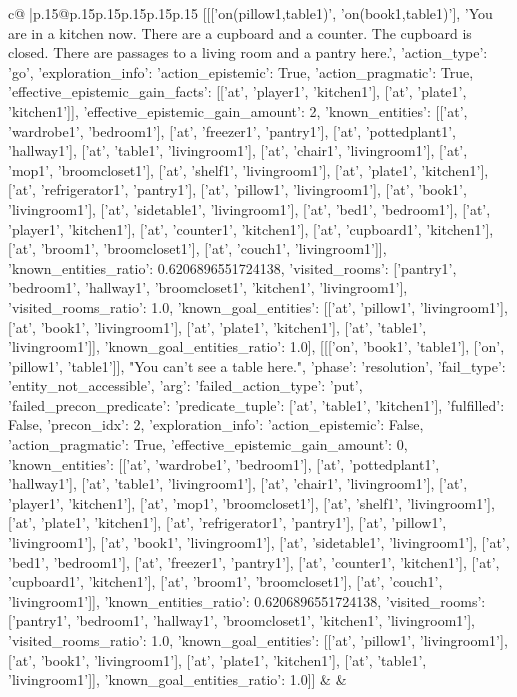 \documentclass{article}
\begin{document}
{\begin{supertabular}{c@{$\;$}|p{.15\linewidth}@{}p{.15\linewidth}p{.15\linewidth}p{.15\linewidth}p{.15\linewidth}p{.15\linewidth}}
{{{	 [[['on(pillow1,table1)', 'on(book1,table1)'], 'You are in a kitchen now. There are a cupboard and a counter. The cupboard is closed. There are passages to a living room and a pantry here.', {'action_type': 'go', 'exploration_info': {'action_epistemic': True, 'action_pragmatic': True, 'effective_epistemic_gain_facts': [['at', 'player1', 'kitchen1'], ['at', 'plate1', 'kitchen1']], 'effective_epistemic_gain_amount': 2, 'known_entities': [['at', 'wardrobe1', 'bedroom1'], ['at', 'freezer1', 'pantry1'], ['at', 'pottedplant1', 'hallway1'], ['at', 'table1', 'livingroom1'], ['at', 'chair1', 'livingroom1'], ['at', 'mop1', 'broomcloset1'], ['at', 'shelf1', 'livingroom1'], ['at', 'plate1', 'kitchen1'], ['at', 'refrigerator1', 'pantry1'], ['at', 'pillow1', 'livingroom1'], ['at', 'book1', 'livingroom1'], ['at', 'sidetable1', 'livingroom1'], ['at', 'bed1', 'bedroom1'], ['at', 'player1', 'kitchen1'], ['at', 'counter1', 'kitchen1'], ['at', 'cupboard1', 'kitchen1'], ['at', 'broom1', 'broomcloset1'], ['at', 'couch1', 'livingroom1']], 'known_entities_ratio': 0.6206896551724138, 'visited_rooms': ['pantry1', 'bedroom1', 'hallway1', 'broomcloset1', 'kitchen1', 'livingroom1'], 'visited_rooms_ratio': 1.0, 'known_goal_entities': [['at', 'pillow1', 'livingroom1'], ['at', 'book1', 'livingroom1'], ['at', 'plate1', 'kitchen1'], ['at', 'table1', 'livingroom1']], 'known_goal_entities_ratio': 1.0}}], [[['on', 'book1', 'table1'], ['on', 'pillow1', 'table1']], "You can't see a table here.", {'phase': 'resolution', 'fail_type': 'entity_not_accessible', 'arg': {'failed_action_type': 'put', 'failed_precon_predicate': {'predicate_tuple': ['at', 'table1', 'kitchen1'], 'fulfilled': False, 'precon_idx': 2}}, 'exploration_info': {'action_epistemic': False, 'action_pragmatic': True, 'effective_epistemic_gain_amount': 0, 'known_entities': [['at', 'wardrobe1', 'bedroom1'], ['at', 'pottedplant1', 'hallway1'], ['at', 'table1', 'livingroom1'], ['at', 'chair1', 'livingroom1'], ['at', 'player1', 'kitchen1'], ['at', 'mop1', 'broomcloset1'], ['at', 'shelf1', 'livingroom1'], ['at', 'plate1', 'kitchen1'], ['at', 'refrigerator1', 'pantry1'], ['at', 'pillow1', 'livingroom1'], ['at', 'book1', 'livingroom1'], ['at', 'sidetable1', 'livingroom1'], ['at', 'bed1', 'bedroom1'], ['at', 'freezer1', 'pantry1'], ['at', 'counter1', 'kitchen1'], ['at', 'cupboard1', 'kitchen1'], ['at', 'broom1', 'broomcloset1'], ['at', 'couch1', 'livingroom1']], 'known_entities_ratio': 0.6206896551724138, 'visited_rooms': ['pantry1', 'bedroom1', 'hallway1', 'broomcloset1', 'kitchen1', 'livingroom1'], 'visited_rooms_ratio': 1.0, 'known_goal_entities': [['at', 'pillow1', 'livingroom1'], ['at', 'book1', 'livingroom1'], ['at', 'plate1', 'kitchen1'], ['at', 'table1', 'livingroom1']], 'known_goal_entities_ratio': 1.0}}]] 
	  } 
	   } 
	   } 
	 & & \\ 
 


\end{supertabular}}
\end{document}
